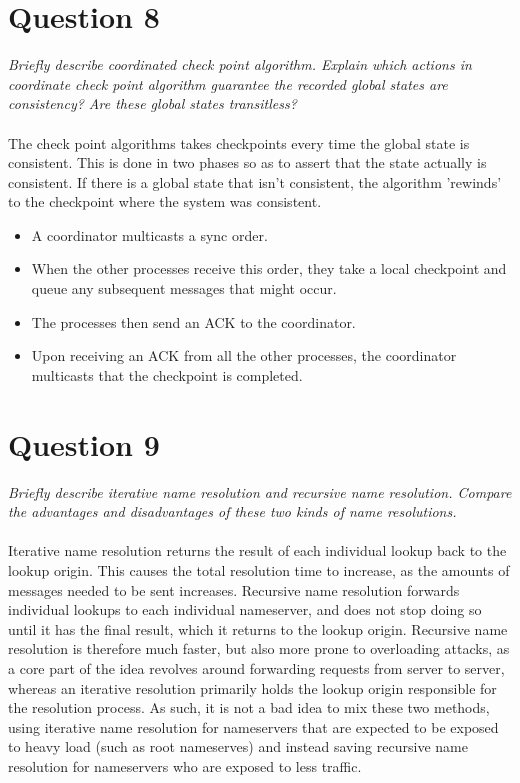 \documentclass[a4paper, titlepage,12pt]{article}
\begin{document}
	\section*{Question 8}
	\emph{Briefly describe coordinated check point algorithm. Explain which actions in coordinate check point algorithm guarantee the recorded global states are consistency? Are these global states transitless?}
\\\\
	The check point algorithms takes checkpoints every time the global state is consistent. This is done in two phases so as to assert that the state actually is consistent. If there is a global state that isn't consistent, the algorithm 'rewinds' to the checkpoint where the system was consistent.
\begin{itemize}
	\item A coordinator multicasts a sync order.
	\item When the other processes receive this order, they take a local checkpoint and queue any subsequent messages that might occur.
	\item The processes then send an ACK to the coordinator.
	\item Upon receiving an ACK from all the other processes, the coordinator multicasts that the checkpoint is completed.
\end{itemize}

	\section*{Question 9}
	\emph{Briefly describe iterative name resolution and recursive name resolution. Compare the advantages and disadvantages of these two kinds of name resolutions.}
\\\\
	Iterative name resolution returns the result of each individual lookup back to the lookup origin. This causes the total resolution time to increase, as the amounts of messages needed to be sent increases. Recursive name resolution forwards individual lookups to each individual nameserver, and does not stop doing so until it has the final result, which it returns to the lookup origin. Recursive name resolution is therefore much faster, but also more prone to overloading attacks, as a core part of the idea revolves around forwarding requests from server to server, whereas an iterative resolution primarily holds the lookup origin responsible for the resolution process. As such, it is not a bad idea to mix these two methods, using iterative name resolution for nameservers that are expected to be exposed to heavy load (such as root nameserves) and instead saving recursive name resolution for nameservers who are exposed to less traffic.
\end{document}
